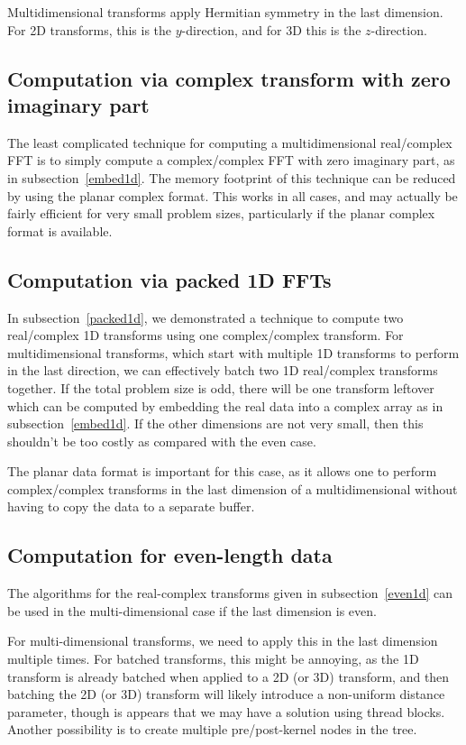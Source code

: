 \documentclass[12pt]{article}
\renewcommand{\(}{\left(}
\renewcommand{\)}{\right)}
\begin{document}
Multidimensional transforms apply Hermitian symmetry in the last
dimension.  For 2D transforms, this is the $y$-direction, and for 3D
this is the $z$-direction.

\subsection{Computation via complex transform with zero imaginary part}

The least complicated technique for computing a multidimensional
real/complex FFT is to simply compute a complex/complex FFT with zero
imaginary part, as in subsection~\ref{embed1d}.  The memory footprint
of this technique can be reduced by using the planar complex format.
This works in all cases, and may actually be fairly efficient for very
small problem sizes, particularly if the planar complex format is
available.

\subsection{Computation via packed 1D FFTs}

In subsection~\ref{packed1d}, we demonstrated a technique to compute
two real/complex 1D transforms using one complex/complex transform.
For multidimensional transforms, which start with multiple 1D
transforms to perform in the last direction, we can effectively batch
two 1D real/complex transforms together.  If the total problem size is
odd, there will be one transform leftover which can be computed by
embedding the real data into a complex array as in
subsection~\ref{embed1d}.  If the other dimensions are not very small,
then this shouldn't be too costly as compared with the even case.

The planar data format is important for this case, as it allows one to
perform complex/complex transforms in the last dimension of a
multidimensional without having to copy the data to a separate buffer.

\subsection{Computation for even-length data}

The algorithms for the real-complex transforms given in
subsection~\ref{even1d} can be used in the multi-dimensional case if
the last dimension is even.

For multi-dimensional transforms, we need to apply this in the last
dimension multiple times.  For batched transforms, this might be
annoying, as the 1D transform is already batched when applied to a 2D
(or 3D) transform, and then batching the 2D (or 3D) transform will
likely introduce a non-uniform distance parameter, though is appears
that we may have a solution using thread blocks.  Another possibility
is to create multiple pre/post-kernel nodes in the tree.
\end{document}
